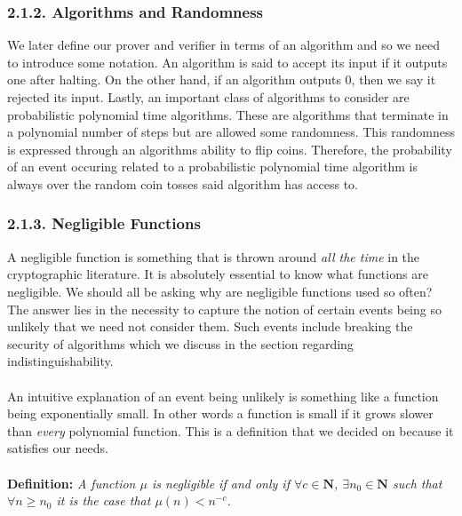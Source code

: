 \documentclass{article}
\newcommand{\N}{{\mathbf N}}
\begin{document}
\subsubsection*{2.1.2. Algorithms and Randomness}
We later define our prover and verifier in terms of an algorithm and so we need to introduce some notation. An algorithm is said to accept its input if it outputs one after halting. On the other hand, if an algorithm outputs 0, then we say it rejected its input. Lastly, an important class of algorithms to consider are probabilistic polynomial time algorithms. These are algorithms that terminate in a polynomial number of steps but are allowed some randomness. This randomness is expressed through an algorithms ability to flip coins. Therefore, the probability of an event occuring related to a probabilistic polynomial time algorithm is always over the random coin tosses said algorithm has access to.

\subsubsection*{2.1.3. Negligible Functions}
A negligible function is something that is thrown around \textit{all the time} in the cryptographic literature. It is absolutely essential to know what functions are negligible. We should all be asking why are negligible functions used so often? The answer lies in the necessity to capture the notion of certain events being so unlikely that we need not consider them. Such events include breaking the security of algorithms which we discuss in the section regarding indistinguishability. \\ \\
\noindent An intuitive explanation of an event being unlikely is something like a function being exponentially small. In other words a function is small if it grows slower than \textit{every} polynomial function. This is a definition that we decided on because it satisfies our needs.\\ \\
\noindent \textbf{Definition:} \emph{A function $\mu$ is negligible if and only if $\forall{c} \in \N$, $\exists n_0 \in \N$ such that $\forall n \geq n_0$ it is the case that $\mu(n) < n^{-c}$.}
\end{document}
